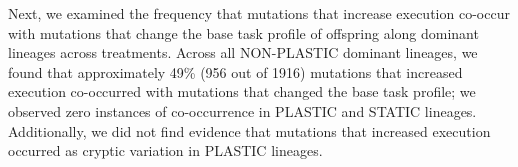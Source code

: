 
Next, we examined the frequency that mutations that increase  execution co-occur with mutations that change the base task profile of offspring along dominant lineages across treatments.
Across all NON-PLASTIC dominant lineages, we found that approximately 49\% (956 out of 1916) mutations that increased  execution co-occurred with mutations that changed the base task profile; we observed zero instances of co-occurrence in PLASTIC and STATIC lineages.
Additionally, we did not find evidence that mutations that increased  execution occurred as cryptic variation in PLASTIC lineages.



